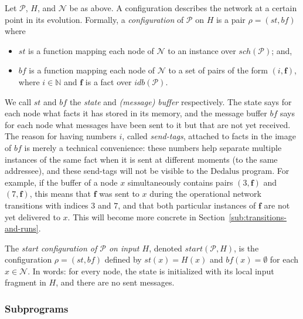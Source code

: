 \documentclass{tlp}
\newcommand{\langname}[1]{\text{#1}}  \newcommand{\pred}[1]{\mathtt{#1}}  \newcommand{\fname}[1]{\mathit{#1}}  \newcommand{\sq}[1]{`{#1}'}
\newcommand{\dedalus}{\langname{Dedalus}}
\newcommand{\Nat}{\mathbb{N}}  \newcommand{\len}[1]{|#1|} \newcommand{\rom}[1]{\text{\emph{(#1)}}} \newcommand{\romI}{\rom i}
\newcommand{\ded}{\mathcal{P}}
\newcommand{\fc}{\boldsymbol{f}}
\newcommand{\idb}[1]{\fname{idb}(#1)}
\newcommand{\schof}[1]{\fname{sch}(#1)}
\newcommand{\nw}{\mathcal{N}}
\newcommand{\cnf}{\rho}
\newcommand{\cnfstart}[2]{\fname{\fname{start}}(#1,#2)}
\newcommand{\cnfs}{\mathit{st}}
\newcommand{\cnfb}{\mathit{bf}}
\newcommand{\pair}[2]{(#1,#2)}
\begin{document}
\label{sub:configurations}

Let $\ded$, $H$, and $\nw$ be as above. A configuration describes
the network at a certain point in its evolution. Formally, a \emph{configuration}
of $\ded$ on $H$ is a pair $\cnf=(\cnfs,\cnfb)$ where 
\begin{itemize}
\item $\cnfs$ is a function mapping each node of $\nw$ to an instance
over $\schof{\ded}$; and,
\item $\cnfb$ is a function mapping each node of $\nw$ to a set of pairs
of the form $\pair i{\fc}$, where $i\in\Nat$ and $\fc$ is a fact
over $\idb{\ded}$.
\end{itemize}
We call $\cnfs$ and $\cnfb$ the \emph{state} and \emph{(message)
buffer} respectively. The state says for each node what facts it
has stored in its memory, and the message buffer $\cnfb$ says for
each node what messages have been sent to it but that are not yet
received. The reason for having numbers $i$, called \emph{send-tags},
attached to facts in the image of $\cnfb$ is merely a technical convenience:
these numbers help separate multiple instances of the same fact when
it is sent at different moments (to the same addressee), and these
send-tags will not be visible to the $\dedalus$ program. For example,
if the buffer of a node $x$ simultaneously contains pairs $\pair 3{\fc}$
and $\pair 7{\fc}$, this means that $\fc$ was sent to $x$ during
the operational network transitions with indices $3$ and $7$, and
that both particular instances of $\fc$ are not yet delivered to
$x$. This will become more concrete in Section~\ref{sub:transitions-and-runs}.

The \emph{start configuration of $\ded$ on input $H$}, denoted
$\cnfstart{\ded}H$, is the configuration $\cnf=(\cnfs,\cnfb)$ defined
by $\cnfs(x)=H(x)$ and $\cnfb(x)=\emptyset$ for each $x\in\nw$.
In words: for every node, the state is initialized with its local
input fragment in $H$, and there are no sent messages.


\subsubsection{Subprograms}

\label{sub:subprograms}
\end{document}
